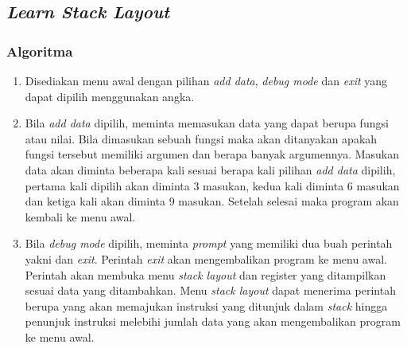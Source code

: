 \documentclass[../main.tex]{subfiles}
\begin{document}
    \subsection{\textit{Learn Stack Layout}}
    \subsubsection{Algoritma}
    {\renewcommand{\labelenumi}{\alph{enumi}.}
        \begin{enumerate}[leftmargin=1.56cm]
            \item {Disediakan menu awal dengan pilihan \textit{add data}, \textit{debug mode} dan \textit{exit} yang dapat dipilih menggunakan angka.}
            \item {Bila \textit{add data} dipilih, meminta memasukan data yang dapat berupa fungsi atau nilai. Bila dimasukan sebuah fungsi maka akan ditanyakan apakah fungsi tersebut memiliki argumen dan berapa banyak argumennya. Masukan data akan diminta beberapa kali sesuai berapa kali pilihan \textit{add data} dipilih, pertama kali dipilih akan diminta 3 masukan, kedua kali diminta 6 masukan dan ketiga kali akan diminta 9 masukan. Setelah selesai maka program akan kembali ke menu awal.}
            \item {Bila \textit{debug mode} dipilih, meminta \textit{prompt} yang memiliki dua buah perintah yakni  dan \textit{exit}. Perintah \textit{exit} akan mengembalikan program ke menu awal. Perintah  akan membuka menu \textit{stack layout} dan register yang ditampilkan sesuai data yang ditambahkan. Menu \textit{stack layout} dapat menerima perintah berupa  yang akan memajukan instruksi yang ditunjuk dalam \textit{stack} hingga penunjuk instruksi melebihi jumlah data yang akan mengembalikan program ke menu awal.}
        \end{enumerate}
    }
    \subsubsection{\Flowchart}
    \newpage
    \subsubsection{\SourceCode}
    \vspace*{-0.25ex}
    \begin{indentlevel0}
        
        
        
    \end{indentlevel0}
\end{document}
